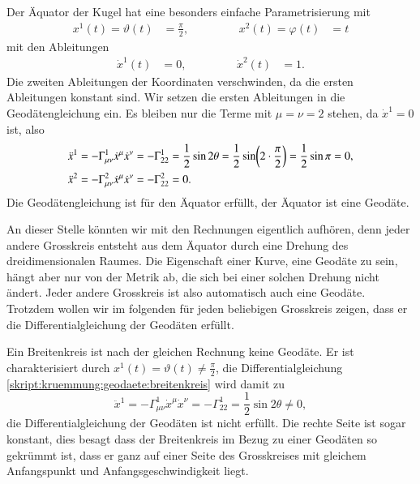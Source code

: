 Der Äquator der Kugel hat eine besonders einfache Parametrisierung mit
\[
\begin{aligned}
x^1(t)=\vartheta(t)&=\frac{\pi}2,
&\qquad&&
x^2(t)=\varphi(t)&=t
\end{aligned}
\]
mit den Ableitungen
\[
\begin{aligned}
\dot x^1(t)&=0,
&\qquad&&
\dot x^2(t)&=1.
\end{aligned}
\]
Die zweiten Ableitungen der Koordinaten verschwinden, da die ersten
Ableitungen konstant sind.
Wir setzen die ersten Ableitungen in die Geodätengleichung ein.
Es bleiben nur die Terme mit $\mu=\nu=2$ stehen, da $\dot x^1=0$ ist,
also
\begin{align}
\ddot x^1
&=
-\Gamma_{\mu\nu}^1\dot x^\mu\dot x^\nu
=
-\Gamma_{22}^1=\frac12\sin2\theta
=
\frac12\sin\biggl( 2\cdot\frac{\pi}2\biggr)
=
\frac12\sin\pi
=
0,
\label{skript:kruemmung:geodaete:breitenkreis}
\\
\ddot x^2
&=
-\Gamma_{\mu\nu}^2\dot x^\mu\dot x^\nu
=
-\Gamma_{22}^2=0.
\notag
\end{align}
Die Geodätengleichung ist für den Äquator erfüllt, der Äquator ist
eine Geodäte.

An dieser Stelle könnten wir mit den Rechnungen eigentlich aufhören, 
denn jeder andere Grosskreis entsteht aus dem Äquator durch eine
Drehung des dreidimensionalen Raumes.
Die Eigenschaft einer Kurve, eine Geodäte zu sein, hängt aber nur von
der Metrik ab, die sich bei einer solchen Drehung nicht ändert.
Jeder andere Grosskreis ist also automatisch auch eine Geodäte.
Trotzdem wollen wir im folgenden für jeden beliebigen Grosskreis
zeigen, dass er die Differentialgleichung der Geodäten erfüllt.

Ein Breitenkreis ist nach der gleichen Rechnung keine Geodäte.
Er ist charakterisiert durch $x^1(t)=\vartheta(t)\ne\frac{\pi}2$,
die Differentialgleichung
\eqref{skript:kruemmung:geodaete:breitenkreis}
wird damit zu
\[
\ddot x^1
=
-\Gamma_{\mu\nu}^1\dot x^\mu\dot x^\nu
=
-\Gamma_{22}^1
=
\frac12\sin2\theta
\ne
0,
\]
die Differentialgleichung der Geodäten ist nicht erfüllt.
Die rechte Seite ist sogar konstant, dies besagt dass der Breitenkreis
im Bezug zu einer Geodäten so gekrümmt ist, dass er ganz
auf einer Seite des Grosskreises mit gleichem Anfangspunkt und
Anfangsgeschwindigkeit liegt.

